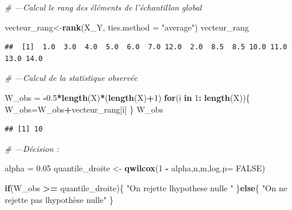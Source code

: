 \documentclass[
  12pt,
]{article}
\newenvironment{Shaded}{\begin{snugshade}}{\end{snugshade}}
\newcommand{\AttributeTok}[1]{\textcolor[rgb]{0.13,0.29,0.53}{#1}}
\newcommand{\CommentTok}[1]{\textcolor[rgb]{0.56,0.35,0.01}{\textit{#1}}}
\newcommand{\ConstantTok}[1]{\textcolor[rgb]{0.56,0.35,0.01}{#1}}
\newcommand{\ControlFlowTok}[1]{\textcolor[rgb]{0.13,0.29,0.53}{\textbf{#1}}}
\newcommand{\DecValTok}[1]{\textcolor[rgb]{0.00,0.00,0.81}{#1}}
\newcommand{\FloatTok}[1]{\textcolor[rgb]{0.00,0.00,0.81}{#1}}
\newcommand{\FunctionTok}[1]{\textcolor[rgb]{0.13,0.29,0.53}{\textbf{#1}}}
\newcommand{\NormalTok}[1]{#1}
\newcommand{\OtherTok}[1]{\textcolor[rgb]{0.56,0.35,0.01}{#1}}
\newcommand{\SpecialCharTok}[1]{\textcolor[rgb]{0.81,0.36,0.00}{\textbf{#1}}}
\newcommand{\StringTok}[1]{\textcolor[rgb]{0.31,0.60,0.02}{#1}}
\begin{document}
\begin{Shaded}
\begin{Highlighting}[]
 \CommentTok{\# —Calcul le rang des éléments de l’échantillon global}
 
\NormalTok{ vecteur\_rang}\OtherTok{\textless{}{-}}\FunctionTok{rank}\NormalTok{(X\_Y, }\AttributeTok{ties.method =} \StringTok{"average"}\NormalTok{)}
\NormalTok{ vecteur\_rang}
\end{Highlighting}
\end{Shaded}

\begin{verbatim}
##  [1]  1.0  3.0  4.0  5.0  6.0  7.0 12.0  2.0  8.5  8.5 10.0 11.0 13.0 14.0
\end{verbatim}

\begin{Shaded}
\begin{Highlighting}[]
 \CommentTok{\# —Calcul de la statistique observée}
 
\NormalTok{ W\_obs }\OtherTok{=} \SpecialCharTok{{-}}\FloatTok{0.5}\SpecialCharTok{*}\FunctionTok{length}\NormalTok{(X)}\SpecialCharTok{*}\NormalTok{(}\FunctionTok{length}\NormalTok{(X)}\SpecialCharTok{+}\DecValTok{1}\NormalTok{)}
 \ControlFlowTok{for}\NormalTok{(i }\ControlFlowTok{in} \DecValTok{1}\SpecialCharTok{:} \FunctionTok{length}\NormalTok{(X))\{}
\NormalTok{ W\_obs}\OtherTok{=}\NormalTok{W\_obs}\SpecialCharTok{+}\NormalTok{vecteur\_rang[i]}
\NormalTok{ \}}
\NormalTok{ W\_obs}
\end{Highlighting}
\end{Shaded}

\begin{verbatim}
## [1] 10
\end{verbatim}

\begin{Shaded}
\begin{Highlighting}[]
 \CommentTok{\# —Décision :}
 
\NormalTok{ alpha }\OtherTok{=} \FloatTok{0.05}
\NormalTok{quantile\_droite }\OtherTok{\textless{}{-}} \FunctionTok{qwilcox}\NormalTok{(}\DecValTok{1} \SpecialCharTok{{-}}\NormalTok{ alpha,n,m,}\AttributeTok{log.p=} \ConstantTok{FALSE}\NormalTok{)}

\ControlFlowTok{if}\NormalTok{(W\_obs }\SpecialCharTok{\textgreater{}=}\NormalTok{ quantile\_droite)\{}
\StringTok{"On rejette l\textquotesingle{}hypothese nulle  "}
\NormalTok{\}}\ControlFlowTok{else}\NormalTok{\{}
\StringTok{"On ne rejette pas l\textquotesingle{}hypothèse nulle"}
\NormalTok{\}}
\end{Highlighting}
\end{Shaded}
\end{document}
